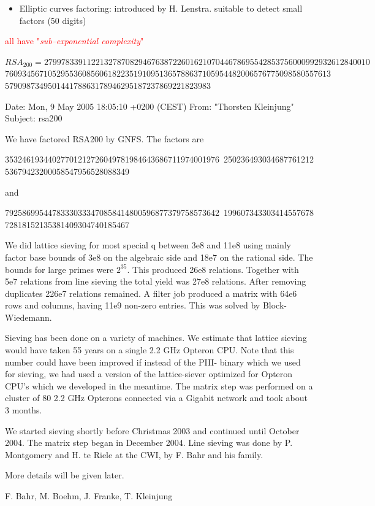 \documentclass[landscape,display]{powersem} %
\newcommand{\heading}[1]{%
 \begin{center}
  \large\bf
  \shadowbox{{\textcolor{conceptcolor}{#1}}}%
 \end{center}
 \vspace{1ex minus 1ex}}
\begin{document}
\begin{slide}
\begin{itemize}
\item[\textcolor{blue}{\ding{185}}]
  Elliptic curves factoring: introduced by  H. Lenstra.
  suitable to detect small factors (50 digits)\pause

\end{itemize}

\centerline{\textcolor{red}{all have "\emph{sub--exponential complexity}"}}
\end{slide}

\begin{slide}
\heading{The factorization of $RSA_{200}$}

\begin{tiny}

$RSA_{200}=2799783391122132787082946763872260162107044678695542853756000992932612840010$
          $7609345671052955360856061822351910951365788637105954482006576775098580557613$
          $579098734950144178863178946295187237869221823983$\pause


Date: Mon, 9 May 2005 18:05:10 +0200 (CEST) 
From: "Thorsten Kleinjung"
Subject: rsa200 

We have factored RSA200 by GNFS. The factors are

35324619344027701212726049781984643686711974001976\
25023649303468776121253679423200058547956528088349

and

79258699544783330333470858414800596877379758573642\
19960734330341455767872818152135381409304740185467


We did lattice sieving for most special q between 3e8 and 11e8
using mainly factor base bounds of 3e8 on the algebraic side and 18e7 
on
the rational side. The bounds for large primes were $2^{35}$. This produced
26e8 relations. Together with 5e7 relations from line sieving the total
yield was 27e8 relations. After removing duplicates 226e7 relations
remained. A filter job produced a matrix with 64e6 rows and columns,
having 11e9 non-zero entries. This was solved by Block-Wiedemann.

Sieving has been done on a variety of machines. We estimate that
lattice sieving would have taken 55 years on a single 2.2 GHz Opteron 
CPU.
Note that this number could have been improved if instead of the PIII-
binary which we used for sieving, we had used a version of the
lattice-siever optimized for Opteron CPU's which we developed in the 
meantime.
The matrix step was performed on a cluster of 80 2.2 GHz Opterons 
connected via a Gigabit network and took about 3 months.

We started sieving shortly before Christmas 2003 and continued until
October 2004. The matrix step began in December 2004.
Line sieving was done by P. Montgomery and H. te Riele at the CWI, by
F. Bahr and his family.

More details will be given later.

F. Bahr, M. Boehm, J. Franke, T. Kleinjung
\end{tiny}
\end{slide}
\end{document}
